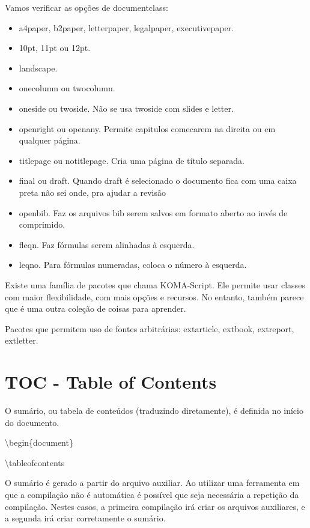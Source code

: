 Vamos verificar as opções de documentclass:
\begin{multicols}{2}
\begin{itemize}
    \item a4paper, b2paper, letterpaper, legalpaper, executivepaper.
    \item 10pt, 11pt ou 12pt. 
    \item landscape.
    \item onecolumn ou twocolumn.
    \item oneside ou twoside. Não se usa twoside com slides e letter.
    \item openright ou openany. Permite capitulos comecarem na direita ou em qualquer página.
    \item titlepage ou notitlepage. Cria uma página de título separada.
    \item final ou draft. Quando draft é selecionado o documento fica com uma caixa preta não sei onde, pra ajudar a revisão
    \item openbib. Faz os arquivos bib serem salvos em formato aberto ao invés de comprimido.
    \item fleqn. Faz fórmulas serem alinhadas à esquerda.
    \item leqno. Para fórmulas numeradas, coloca o número à esquerda.
\end{itemize}
\end{multicols}

Existe uma família de pacotes que chama KOMA-Script.
Ele permite usar classes com maior flexibilidade, com mais opções e recursos.
No entanto, também parece que é uma outra coleção de coisas para aprender.

Pacotes que permitem uso de fontes arbitrárias:
extarticle, extbook, extreport, extletter.

\section{TOC - Table of Contents}
O sumário, ou tabela de conteúdos (traduzindo diretamente), é definida no início do documento.

\noindent \textbackslash begin\{document\}

\noindent \textbackslash tableofcontents

O sumário é gerado a partir do arquivo auxiliar.
Ao utilizar uma ferramenta em que a compilação não é automática é possível que seja necessária a repetição da compilação.
Nestes casos, a primeira compilação irá criar os arquivos auxiliares, e a segunda irá criar corretamente o sumário.

